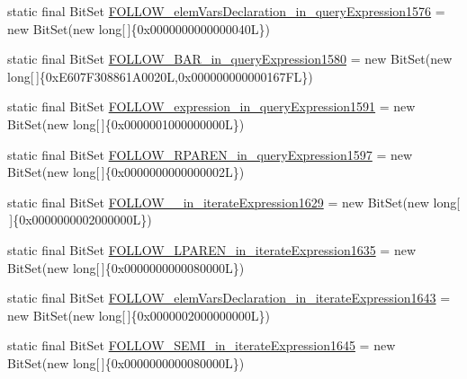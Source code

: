 \begin{DoxyCompactItemize}
\item 
static final Bit\-Set \hyperlink{classorg_1_1tzi_1_1use_1_1parser_1_1ocl_1_1_o_c_l_parser_a42313fe3847ef274fba5cf61bfddeec7}{F\-O\-L\-L\-O\-W\-\_\-elem\-Vars\-Declaration\-\_\-in\-\_\-query\-Expression1576} = new Bit\-Set(new long\mbox{[}$\,$\mbox{]}\{0x0000000000000040\-L\})
\item 
static final Bit\-Set \hyperlink{classorg_1_1tzi_1_1use_1_1parser_1_1ocl_1_1_o_c_l_parser_a5adb123782467410820d4e2dafbf9e1e}{F\-O\-L\-L\-O\-W\-\_\-\-B\-A\-R\-\_\-in\-\_\-query\-Expression1580} = new Bit\-Set(new long\mbox{[}$\,$\mbox{]}\{0x\-E607\-F308861\-A0020\-L,0x000000000000167\-F\-L\})
\item 
static final Bit\-Set \hyperlink{classorg_1_1tzi_1_1use_1_1parser_1_1ocl_1_1_o_c_l_parser_ae4123afb4046da6ec2cdb7ea92bffd7e}{F\-O\-L\-L\-O\-W\-\_\-expression\-\_\-in\-\_\-query\-Expression1591} = new Bit\-Set(new long\mbox{[}$\,$\mbox{]}\{0x0000001000000000\-L\})
\item 
static final Bit\-Set \hyperlink{classorg_1_1tzi_1_1use_1_1parser_1_1ocl_1_1_o_c_l_parser_aa73183813961a6fffa90857b0687f400}{F\-O\-L\-L\-O\-W\-\_\-\-R\-P\-A\-R\-E\-N\-\_\-in\-\_\-query\-Expression1597} = new Bit\-Set(new long\mbox{[}$\,$\mbox{]}\{0x0000000000000002\-L\})
\item 
static final Bit\-Set \hyperlink{classorg_1_1tzi_1_1use_1_1parser_1_1ocl_1_1_o_c_l_parser_a2ae2c39cf7e74e6350378d2eaf458408}{F\-O\-L\-L\-O\-W\-\_\-\_\-in\-\_\-iterate\-Expression1629} = new Bit\-Set(new long\mbox{[}$\,$\mbox{]}\{0x0000000002000000\-L\})
\item 
static final Bit\-Set \hyperlink{classorg_1_1tzi_1_1use_1_1parser_1_1ocl_1_1_o_c_l_parser_a8332da98b1185d699b4a3cfca80912b3}{F\-O\-L\-L\-O\-W\-\_\-\-L\-P\-A\-R\-E\-N\-\_\-in\-\_\-iterate\-Expression1635} = new Bit\-Set(new long\mbox{[}$\,$\mbox{]}\{0x0000000000080000\-L\})
\item 
static final Bit\-Set \hyperlink{classorg_1_1tzi_1_1use_1_1parser_1_1ocl_1_1_o_c_l_parser_a9cfe32d8350950fb6b740853623c6d0a}{F\-O\-L\-L\-O\-W\-\_\-elem\-Vars\-Declaration\-\_\-in\-\_\-iterate\-Expression1643} = new Bit\-Set(new long\mbox{[}$\,$\mbox{]}\{0x0000002000000000\-L\})
\item 
static final Bit\-Set \hyperlink{classorg_1_1tzi_1_1use_1_1parser_1_1ocl_1_1_o_c_l_parser_a7ba0f85c9e7f62f0cec251fdb6ba2786}{F\-O\-L\-L\-O\-W\-\_\-\-S\-E\-M\-I\-\_\-in\-\_\-iterate\-Expression1645} = new Bit\-Set(new long\mbox{[}$\,$\mbox{]}\{0x0000000000080000\-L\})
\item 

\end{DoxyCompactItemize}
